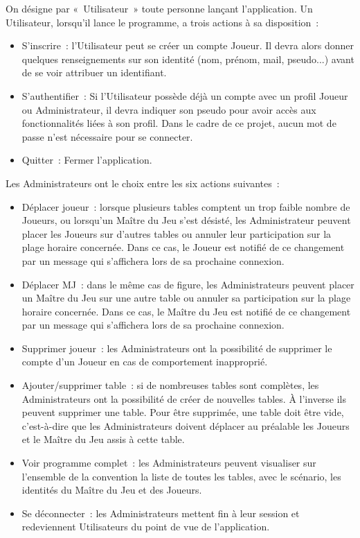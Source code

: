 \documentclass[11pt]{article}
\begin{document}
On désigne par «~Utilisateur~» toute personne lançant l'application. Un Utilisateur, lorsqu'il lance le programme, a trois actions à sa disposition~:
\begin{itemize}
    \item{S'inscrire~: l'Utilisateur peut se créer un compte Joueur. Il devra alors donner quelques renseignements sur son identité (nom, prénom, mail, pseudo...) avant de se voir attribuer un identifiant.}
    \item{S'authentifier~: Si l'Utilisateur possède déjà un compte avec un profil Joueur ou Administrateur, il devra indiquer son pseudo pour avoir accès aux fonctionnalités liées à son profil. Dans le cadre de ce projet, aucun mot de passe n'est nécessaire pour se connecter.}
    \item{Quitter~:  Fermer l'application.\\}
\end{itemize}

Les Administrateurs ont le choix entre les six actions suivantes~:
\begin{itemize}
    \item {Déplacer joueur~: lorsque plusieurs tables comptent un trop faible nombre de Joueurs, ou lorsqu'un Maître du Jeu s'est désisté, les Administrateur peuvent placer les Joueurs sur d'autres tables ou annuler leur participation sur la plage horaire concernée. Dans ce cas, le Joueur est notifié de ce changement par un message qui s'affichera lors de sa prochaine connexion.}
    \item{Déplacer MJ~: dans le même cas de figure, les Administrateurs peuvent placer un Maître du Jeu sur une autre table ou annuler sa participation sur la plage horaire concernée. Dans ce cas, le Maître du Jeu est notifié de ce changement par un message qui s'affichera lors de sa prochaine connexion.}
    \item{Supprimer joueur~: les Administrateurs ont la possibilité de supprimer le compte d'un Joueur en cas de comportement inapproprié.}
    \item{Ajouter/supprimer table~: si de nombreuses tables sont complètes, les Administrateurs ont la possibilité de créer de nouvelles tables. À l'inverse ils peuvent supprimer une table. Pour être supprimée, une table doit être vide, c'est-à-dire que les Administrateurs doivent déplacer au préalable les Joueurs et le Maître du Jeu assis à cette table.}
    \item{Voir programme complet~: les Administrateurs peuvent visualiser sur l'ensemble de la convention la liste de toutes les tables, avec le scénario, les identités du Maître du Jeu et des Joueurs.}
    \item{Se déconnecter~: les Administrateurs mettent fin à leur session et redeviennent Utilisateurs du point de vue de l'application.\\}
\end{itemize}
\end{document}
